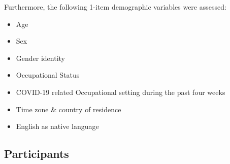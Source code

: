 \documentclass[
  english,
  man]{apa6}
\providecommand{\tightlist}{%
  \setlength{\itemsep}{0pt}\setlength{\parskip}{0pt}}
\begin{document}
Furthermore, the following 1-item demographic variables were assessed:

\begin{itemize}
\tightlist
\item
  Age
\item
  Sex
\item
  Gender identity
\item
  Occupational Status
\item
  COVID-19 related Occupational setting during the past four weeks
\item
  Time zone \& country of residence
\item
  English as native language
\end{itemize}

\hypertarget{participants}{%
\subsection{Participants}\label{participants}}
\end{document}
